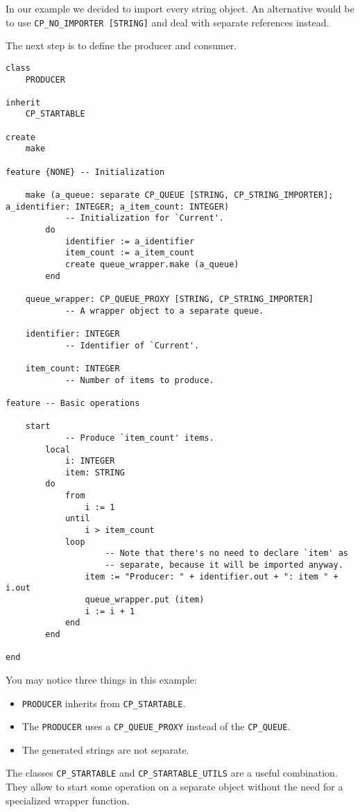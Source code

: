 In our example we decided to import every string object.
An alternative would be to use \lstinline!CP_NO_IMPORTER [STRING]! and deal with separate references instead.

The next step is to define the producer and consumer.

\begin{lstlisting}[language=OOSC2Eiffel, captionpos=b, caption={The producer class.}]
class
	PRODUCER

inherit
	CP_STARTABLE

create
	make

feature {NONE} -- Initialization

	make (a_queue: separate CP_QUEUE [STRING, CP_STRING_IMPORTER]; a_identifier: INTEGER; a_item_count: INTEGER)
			-- Initialization for `Current'.
		do
			identifier := a_identifier
			item_count := a_item_count
			create queue_wrapper.make (a_queue)
		end

	queue_wrapper: CP_QUEUE_PROXY [STRING, CP_STRING_IMPORTER]
			-- A wrapper object to a separate queue.

	identifier: INTEGER
			-- Identifier of `Current'.

	item_count: INTEGER
			-- Number of items to produce.

feature -- Basic operations

	start
			-- Produce `item_count' items.
		local
			i: INTEGER
			item: STRING
		do
			from
				i := 1
			until
				i > item_count
			loop
					-- Note that there's no need to declare `item' as 
					-- separate, because it will be imported anyway.
				item := "Producer: " + identifier.out + ": item " + i.out
				queue_wrapper.put (item)
				i := i + 1
			end
		end

end
\end{lstlisting}

You may notice three things in this example:

\begin{itemize}
 \item \lstinline!PRODUCER! inherits from \lstinline!CP_STARTABLE!.
 \item The \lstinline!PRODUCER! uses a \lstinline!CP_QUEUE_PROXY! instead of the \lstinline!CP_QUEUE!.
 \item The generated strings are not separate.
\end{itemize}

The classes \lstinline!CP_STARTABLE! and \lstinline!CP_STARTABLE_UTILS! are a useful combination.
They allow to start some operation on a separate object without the need for a specialized wrapper function.

